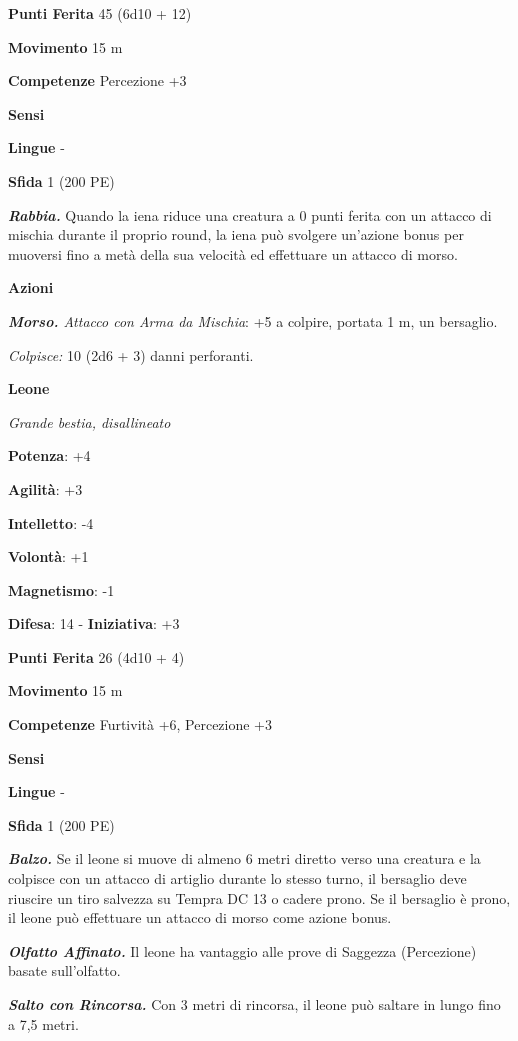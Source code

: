 \begin{multicols}{2}
\textbf{Punti Ferita} 45 (6d10 + 12)

\textbf{Movimento} 15 m

\textbf{Competenze} Percezione +3

\textbf{Sensi} 

\textbf{Lingue} -

\textbf{Sfida} 1 (200 PE)\smallskip

\emph{\textbf{Rabbia.}} Quando la iena riduce una creatura a 0 punti
ferita con un attacco di mischia durante il proprio round, la iena può
svolgere un'azione bonus per muoversi fino a metà della sua velocità ed
effettuare un attacco di morso.

\smallskip\textbf{Azioni}

\emph{\textbf{Morso.} Attacco con Arma da Mischia}: +5 a colpire,
portata 1 m, un bersaglio.

\emph{Colpisce:} 10 (2d6 + 3) danni perforanti.



\textbf{Leone}

\emph{Grande bestia, disallineato}

\textbf{Potenza}: +4

\textbf{Agilità}: +3

\textbf{Intelletto}: -4

\textbf{Volontà}: +1

\textbf{Magnetismo}: -1

\textbf{Difesa}: 14 - \textbf{Iniziativa}: +3

\textbf{Punti Ferita} 26 (4d10 + 4)

\textbf{Movimento} 15 m

\textbf{Competenze} Furtività +6, Percezione +3

\textbf{Sensi} 

\textbf{Lingue} -

\textbf{Sfida} 1 (200 PE)\smallskip

\emph{\textbf{Balzo.}} Se il leone si muove di almeno 6 metri diretto
verso una creatura e la colpisce con un attacco di artiglio durante lo
stesso turno, il bersaglio deve riuscire un tiro salvezza su Tempra DC 13
o cadere prono. Se il bersaglio è prono, il leone può effettuare un
attacco di morso come azione bonus.

\emph{\textbf{Olfatto Affinato.}} Il leone ha vantaggio alle prove di
Saggezza (Percezione) basate sull'olfatto.

\emph{\textbf{Salto con Rincorsa.}} Con 3 metri di rincorsa, il leone
può saltare in lungo fino a 7,5 metri.


\end{multicols}
